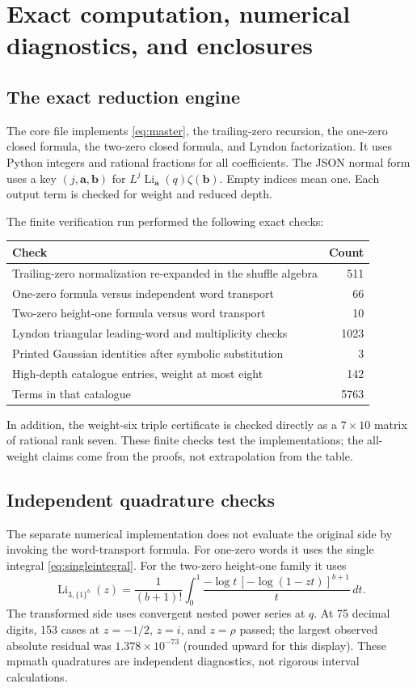 \documentclass[11pt]{article}
\numberwithin{equation}{section}
\theoremstyle{definition}\newtheorem{definition}[theorem]{Definition}
\theoremstyle{remark}\newtheorem{remark}[theorem]{Remark}
\DeclareMathOperator{\Li}{Li}
\newcommand{\ones}[1]{\{1\}^{#1}}
\newcommand{\code}[1]{\texttt{\detokenize{#1}}}
\begin{document}
\section{Exact computation, numerical diagnostics, and enclosures}

\subsection{The exact reduction engine}
The core file \code{code/polylog_words.py} implements
\eqref{eq:master}, the trailing-zero recursion, the one-zero closed
formula, the two-zero closed formula, and Lyndon factorization.
It uses Python integers and rational fractions for all coefficients.
The JSON normal form uses a key $(j,\boldsymbol a,\boldsymbol b)$ for
$L^j\Li_{\boldsymbol a}(q)\zeta(\boldsymbol b)$.
Empty indices mean one. Each output term is checked for weight and
reduced depth.

The finite verification run performed the following exact checks:
\begin{center}
\begin{tabular}{lr}
\toprule
Check & Count\\
\midrule
Trailing-zero normalization re-expanded in the shuffle algebra & 511\\
One-zero formula versus independent word transport & 66\\
Two-zero height-one formula versus word transport & 10\\
Lyndon triangular leading-word and multiplicity checks & 1023\\
Printed Gaussian identities after symbolic substitution & 3\\
High-depth catalogue entries, weight at most eight & 142\\
Terms in that catalogue & 5763\\
\bottomrule
\end{tabular}
\end{center}
In addition, the weight-six triple certificate is checked directly as a
$7\times10$ matrix of rational rank seven.
These finite checks test the implementations; the all-weight claims
come from the proofs, not extrapolation from the table.

\subsection{Independent quadrature checks}
The separate numerical implementation does not evaluate the original
side by invoking the word-transport formula. For one-zero words it
uses the single integral \eqref{eq:singleintegral}. For the two-zero
height-one family it uses
\begin{equation}\label{eq:twointegral}
 \Li_{3,\ones b}(z)=\frac1{(b+1)!}\int_0^1
 \frac{-\log t\,[-\log(1-zt)]^{b+1}}{t}\,dt.
\end{equation}
The transformed side uses convergent nested power series at $q$.
At 75 decimal digits, 153 cases at $z=-1/2$, $z=i$, and $z=\rho$
passed; the largest observed absolute residual was
$1.378\times10^{-73}$ (rounded upward for this display).
These mpmath quadratures are independent diagnostics, not rigorous
interval calculations.
\end{document}
